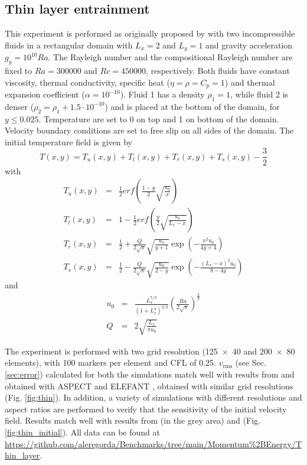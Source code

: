 \documentclass[hidelinks,10pt,a4paper]{article}
\begin{document}
\subsection{Thin layer entrainment}\label{sec:thin}
This experiment is performed as originally proposed by \citet{vanKeken1997} with two incompressible fluids in a rectangular domain with $L_x=2$ and $L_y=1$
and gravity acceleration $g_y=10^{10}Ra$. The Rayleigh number and the compositional Rayleigh number are fixed to $Ra=300000$ and $Rc=450000$, respectively.
Both fluids have constant viscosity, thermal conductivity, specific heat ($\eta=\rho=C_p=1$) and thermal expansion coefficient ($\alpha=10^{-10}$). Fluid 1
has a density $\rho_1=1$, while fluid 2 is denser ($\rho_2=\rho_1+1.5 \cdot 10^{-10}$) and is placed at the bottom of the domain, for $y \leq 0.025$.
Temperature are set to 0 on top and 1 on bottom of the domain. Velocity boundary conditions are set to free slip on all sides of the domain. The initial
temperature field is given by
\[T(x,y)=T_u(x,y)+T_l(x,y)+T_r(x,y)+T_s(x,y)-\frac{3}{2}\]
with
\begin{eqnarray}
T_u(x,y)&=&\frac{1}{2}erf\left(\frac{1-y}{2}\sqrt{\frac{u_0}{x}}\right)\nonumber \\
T_l(x,y)&=&1-\frac{1}{2}erf\left(\frac{y}{2}\sqrt{\frac{u_0}{L_x-x}}\right)\nonumber \\
T_r(x,y)&=&\frac{1}{2}+\frac{Q}{2\sqrt{\pi}}\sqrt{\frac{u_0}{y+1}} \exp\left(-\frac{x^2u_0}{4y+4}\right)\nonumber \\
T_s(x,y)&=&\frac{1}{2}-\frac{Q}{2\sqrt{\pi}}\sqrt{\frac{u_0}{2-y}} \exp\left(-\frac{(L_x-x)^2u_0}{8-4y}\right)\nonumber
\end{eqnarray}
and
\begin{eqnarray}
u_0&=&\frac{L_x^{7/3}}{(1+L_x^4)^{2/3}}\left(\frac{Ra}{2\sqrt{\pi}}\right)^{\frac{2}{3}}\nonumber \\
Q&=&2\sqrt{\frac{L_x}{\pi u_0}}\nonumber
\end{eqnarray}

The experiment is performed with two grid resolution (\num{125x40} and \num{200x80} elements), with 100 markers per element and CFL of 0.25. $v_{\textrm{rms}}$
(see Sec. \ref{sec:error}) calculated for both the simulations match well with results from \citet{vanKeken1997} and obtained with ASPECT
\citep{KHB12,heister_aspect_methods2,aspect-doi-v2.2.0,aspectmanual} and ELEFANT \citep{Thieulot2014}, obtained with similar grid resolutions
(Fig. \ref{fig:thin}). In addition, a variety of simulations with different resolutions and aspect ratios are performed to verify that the sensitivity of the
initial velocity field. Results match well with results from \citet{vanKeken1997} (in the grey area) and \citet{Thieulot2014} (Fig. \ref{fig:thin_initial}). 
All data can be found at \url{https://github.com/aleregorda/Benchmarks/tree/main/Momentum%2BEnergy/Thin_layer}.
\end{document}
